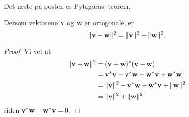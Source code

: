  Det neste på posten er Pytagoras' teorem. 

\begin{thm}
Dersom vektorene $\mathbf{v}$ og $\mathbf{w}$ er ortogonale, er
\[
\|\mathbf{v}-\mathbf{w}\|^2=\|\mathbf{v}\|^2+\|\mathbf{w}\|^2.
\]
\end{thm}

\begin{proof}
Vi vet at 
\begin{align*}
\|\mathbf{v}-\mathbf{w} \|^2&=(\mathbf{v}-\mathbf{w})^*(\mathbf{v}-\mathbf{w})\\&=\mathbf{v}^*\mathbf{v}-\mathbf{v}^*\mathbf{w}-\mathbf{w}^*\mathbf{v}+\mathbf{w}^*\mathbf{w}\\ & =\|\mathbf{v}\|^2 -\mathbf{v}^*\mathbf{w}-\mathbf{w}^*\mathbf{v}+\|\mathbf{w}\|^2\\ &=\|\mathbf{v}\|^2 +\|\mathbf{w}\|^2\\
\end{align*}
siden $\mathbf{v}^*\mathbf{w}-\mathbf{w}^*\mathbf{v}=0$.
\end{proof}

